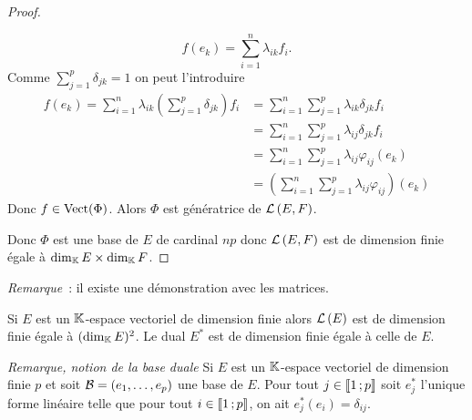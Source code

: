 \begin{proof}
\begin{enumerate}
      \begin{equation}
        f(e_k)= \sum_{i=1}^n \lambda_{ik} f_i.
      \end{equation}
      Comme \(\sum_{j=1}^p \delta_{jk}=1\) on peut l'introduire
      \begin{align}
        f(e_k) = \sum_{i=1}^n \lambda_{ik} \left(\sum_{j=1}^p \delta_{jk}\right) f_i &= \sum_{i=1}^n \sum_{j=1}^p \lambda_{ik} \delta_{jk} f_i \\
                                                                                     &=\sum_{i=1}^n \sum_{j=1}^p \lambda_{ij} \delta_{jk} f_i\\
                                                                                     &=\sum_{i=1}^n \sum_{j=1}^p \lambda_{ij} \varphi_{ij}(e_k)\\
                                                                                     &=\left(\sum_{i=1}^n \sum_{j=1}^p \lambda_{ij} \varphi_{ij}\right)(e_k)
      \end{align}
      Donc \(f \in \operatorname{Vect}(\Phi)\). Alors \(\Phi\) est génératrice de \(\mathcal{L}\left(E,F\right)\).
  \end{enumerate}
  Donc \(\Phi\) est une base de \(E\) de cardinal \(np\) donc \(\mathcal{L}\left(E,F\right)\) est de dimension finie égale à \(\operatorname{dim}_{\mathbb{K}} E \times \operatorname{dim}_{\mathbb{K}} F\).
\end{proof}

\emph{Remarque}~: il existe une démonstration avec les matrices.

\begin{corth}
  Si \(E\) est un \(\mathbb{K}\)-espace vectoriel de dimension finie alors \(\mathcal{L}\left(E\right)\) est de dimension finie égale à \((\operatorname{dim}_{\mathbb{K}} E)^2\). Le dual \(E^*\) est de dimension finie égale à celle de \(E\).
\end{corth}

\emph{Remarque, notion de la base duale} Si \(E\) est un \(\mathbb{K}\)-espace vectoriel de dimension finie \(p\) et soit \(\mathcal{B}=(e_1, \ldots, e_p)\) une base de \(E\). Pour tout \(j \in  \mathopen{\llbracket}1\mathclose{}\mathpunct{};p\mathclose{\rrbracket}\) soit \(e_j^*\) l'unique forme linéaire telle que pour tout \(i \in  \mathopen{\llbracket}1\mathclose{}\mathpunct{};p\mathclose{\rrbracket}\), on ait \(e_j^*(e_i)=\delta_{ij}\).


